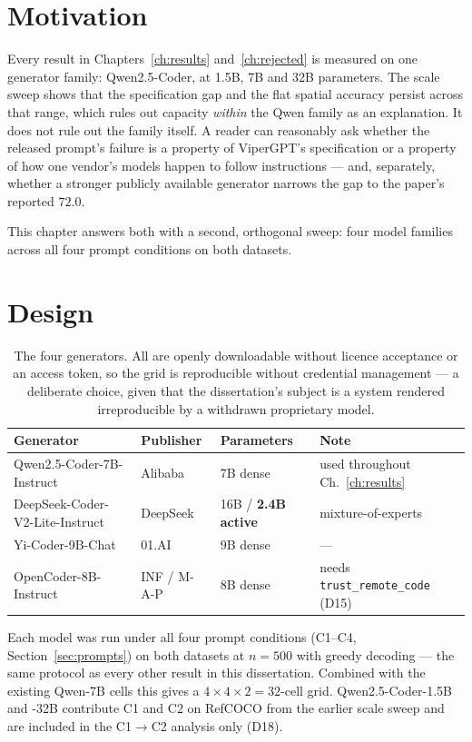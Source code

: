 \documentclass[12pt,a4paper,oneside]{report}
\begin{document}
\section{Motivation}

Every result in Chapters~\ref{ch:results} and~\ref{ch:rejected} is measured on one
generator family: Qwen2.5-Coder, at 1.5B, 7B and 32B parameters. The scale sweep
shows that the specification gap and the flat spatial accuracy persist across that
range, which rules out capacity \emph{within} the Qwen family as an explanation. It
does not rule out the family itself. A reader can reasonably ask whether the released
prompt's failure is a property of ViperGPT's specification or a property of how one
vendor's models happen to follow instructions --- and, separately, whether a stronger
publicly available generator narrows the gap to the paper's reported $72.0$.

This chapter answers both with a second, orthogonal sweep: four model families across
all four prompt conditions on both datasets.

\section{Design}

\begin{table}[htbp]\centering\small
\caption{The four generators. All are openly downloadable without licence acceptance
or an access token, so the grid is reproducible without credential management --- a
deliberate choice, given that the dissertation's subject is a system rendered
irreproducible by a withdrawn proprietary model.}
\label{tab:m4-models}
\begin{tabular}{@{}llll@{}}
\toprule
\textbf{Generator} & \textbf{Publisher} & \textbf{Parameters} & \textbf{Note} \\
\midrule
Qwen2.5-Coder-7B-Instruct & Alibaba & 7B dense & used throughout Ch.~\ref{ch:results} \\
DeepSeek-Coder-V2-Lite-Instruct & DeepSeek & 16B / \textbf{2.4B active} & mixture-of-experts \\
Yi-Coder-9B-Chat & 01.AI & 9B dense & --- \\
OpenCoder-8B-Instruct & INF / M-A-P & 8B dense & needs \texttt{trust\_remote\_code} (D15) \\
\bottomrule
\end{tabular}
\end{table}

Each model was run under all four prompt conditions (C1--C4,
Section~\ref{sec:prompts}) on both datasets at $n=500$ with greedy decoding --- the
same protocol as every other result in this dissertation. Combined with the existing
Qwen-7B cells this gives a $4 \times 4 \times 2 = 32$-cell grid. Qwen2.5-Coder-1.5B
and -32B contribute C1 and C2 on RefCOCO from the earlier scale sweep and are
included in the C1$\to$C2 analysis only (D18).
\end{document}
